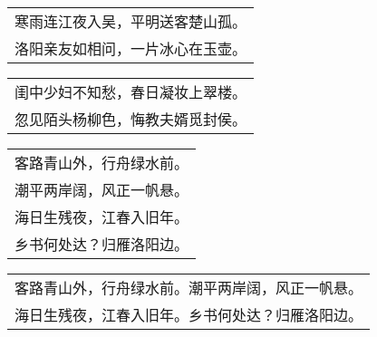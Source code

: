 \nopagebreak%
\nopagebreak%
\noindent\begin{minipage}{\linewidth}
  \vskip-3pt\begin{table}[H]
    \centering
    \begin{tabular}{@{}l@{}}
寒雨连江夜入吴，平明送客楚山孤。\\
洛阳亲友如相问，一片冰心在玉壶。
    \end{tabular}
  \end{table}
\end{minipage}
\vspace{1cm}


\nopagebreak%
\nopagebreak%
\noindent\begin{minipage}{\linewidth}
  \vskip-3pt\begin{table}[H]
    \centering
    \begin{tabular}{@{}l@{}}
闺中少妇不知愁，春日凝妆上翠楼。\\
忽见陌头杨柳色，悔教夫婿觅封侯。
    \end{tabular}
  \end{table}
\end{minipage}
\vspace{1cm}


\nopagebreak%
\nopagebreak%
\noindent\begin{minipage}{\linewidth}
  \vskip-3pt\begin{table}[H]
    \centering
    \begin{tabular}{@{}l@{}}
客路青山外，行舟绿水前。\\
潮平两岸阔，风正一帆悬。\\
海日生残夜，江春入旧年。\\
乡书何处达？归雁洛阳边。
    \end{tabular}
  \end{table}
\end{minipage}
\vspace{1cm}


\nopagebreak%
\nopagebreak%
\noindent\begin{minipage}{\linewidth}
  \vskip-3pt\begin{table}[H]
    \centering
    \begin{tabular}{@{}l@{}}
客路青山外，行舟绿水前。潮平两岸阔，风正一帆悬。\\
海日生残夜，江春入旧年。乡书何处达？归雁洛阳边。
    \end{tabular}
  \end{table}
\end{minipage}
\vspace{1cm}


